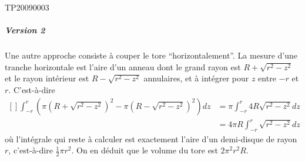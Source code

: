 \begin{corrige}{TP20090003}
	\subparagraph{Version 2}
	Une autre approche consiste à couper le tore ``horizontalement''. La
	mesure d'une tranche horizontale est l'aire d'un anneau dont le grand
	rayon est $R + \sqrt{r^2 - z^2}$ et le rayon intérieur est $R - \sqrt{r^2 - z^2}$
	annulaires, et à intégrer pour $z$ entre $-r$ et $r$. C'est-à-dire
	\begin{equation}
		\begin{aligned}[]
			\int_{-r}^r \left(\pi (R+\sqrt{r^2-z^2})^2 - \pi (R-\sqrt{r^2-z^2})^2\right)  d z & = \pi \int_{-r}^r 4 R \sqrt{r^2 - z^2}  d z \\
			                                                                                  & = 4 \pi R \int_{-r}^r \sqrt{r^2-z^2}  d z
		\end{aligned}
	\end{equation}
	où l'intégrale qui reste à calculer est exactement l'aire d'un demi-disque de rayon $r$, c'est-à-dire $\frac{ 1 }{2} \pi r^2$. On en déduit que le
	volume du tore est $2 \pi^2 r^2 R$.




\end{corrige}
